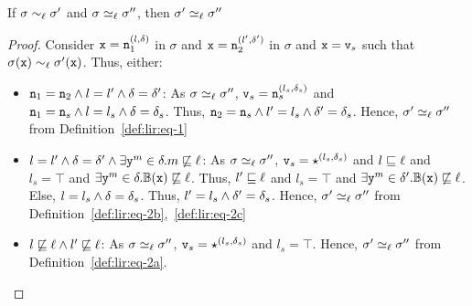 \begin{myLemma}[Equivalence]
\label{lem:app:lir:equiv}
If $\sigma \sim_\ell \sigma'$ and $\sigma \simeq_\ell
\sigma''$, then $\sigma' \simeq_\ell \sigma''$
\end{myLemma}
\begin{proof}
Consider $\texttt{x} = \texttt{n}_1^{(l, \delta)}$ in $\sigma$ and $\texttt{x} = \texttt{n}_2^{(l', \delta')}$
in $\sigma$ and $\texttt{x} = \texttt{v}_s$ such that $\sigma(\texttt{x}) \sim_\ell 
\sigma'(\texttt{x})$. Thus, either:
\begin{itemize}
\item $\texttt{n}_1 = \texttt{n}_2 \wedge l = l' \wedge \delta = \delta'$: As $\sigma
  \simeq_\ell \sigma''$, $\texttt{v}_s = \texttt{n}_s^{(l_s, \delta_s)}$ and $\texttt{n}_1 =
  \texttt{n}_s \wedge l = l_s \wedge \delta =\delta_s$. Thus, $\texttt{n}_2 =
  \texttt{n}_s \wedge l' = l_s \wedge \delta' =\delta_s$. Hence, $\sigma'
  \simeq_\ell \sigma''$ from Definition~\ref{def:lir:eq-1}
\item $l = l' \wedge \delta = \delta' \wedge \exists \texttt{y}^m \in \delta. m
  \not\sqsubseteq \ell$: As $\sigma
  \simeq_\ell \sigma''$, $\texttt{v}_s = \star^{(l_s, \delta_s)}$ and $l
  \sqsubseteq \ell$ and $l_s = \top$ and $\exists \texttt{y}^m \in
  \delta. \mathbb{B}(\texttt{x}) \not\sqsubseteq \ell$. Thus, $l'
  \sqsubseteq \ell$ and $l_s = \top$ and $\exists \texttt{y}^m \in
  \delta'. \mathbb{B}(\texttt{x}) \not\sqsubseteq \ell$. 
  Else, $l=l_s \wedge \delta=\delta_s$. Thus, $l'=l_s \wedge
  \delta'=\delta_s$. Hence, $\sigma'
  \simeq_\ell \sigma''$ from
  Definition~\ref{def:lir:eq-2b},~\ref{def:lir:eq-2c} 
\item $l \not\sqsubseteq \ell \wedge l' \not\sqsubseteq
  \ell$: As $\sigma
  \simeq_\ell \sigma''$, $\texttt{v}_s = \star^{(l_s, \delta_s)}$ and $l_s
  =\top$. Hence, $\sigma' \simeq_\ell \sigma''$ from
  Definition~\ref{def:lir:eq-2a}.
\end{itemize}
\end{proof}


